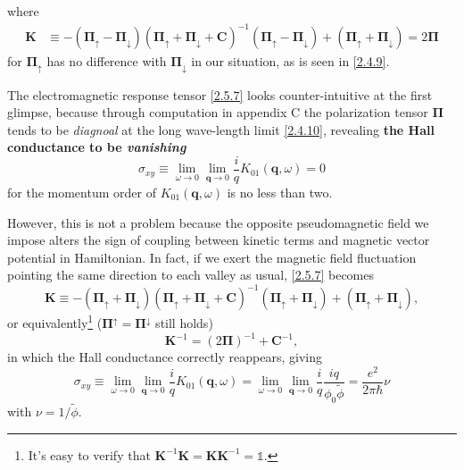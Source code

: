 \documentclass[bachelor,english,numbers]{ustcthesis}
\begin{document}
		where
		\begin{align}\label{2.5.7}
			\bm{K}&\equiv-(\bm{\Pi}_\uparrow-\bm{\Pi}_\downarrow)(\bm{\Pi}_\uparrow+\bm{\Pi}_\downarrow+\bm{C})^{-1}(\bm{\Pi}_\uparrow-\bm{\Pi}_\downarrow)+(\bm{\Pi}_\uparrow+\bm{\Pi}_\downarrow)=2\bm{\Pi}
		\end{align}
		for $\bm{\Pi}_\uparrow$ has no difference with $\bm{\Pi}_\downarrow$ in our situation, as is seen in \eqref{2.4.9}.\par
		The electromagnetic response tensor \eqref{2.5.7} looks counter-intuitive at the first glimpse, because through computation in appendix C the polarization tensor $\bm{\Pi}$ tends to be \emph{diagnoal} at the long wave-length limit \eqref{2.4.10}, revealing {\bf the Hall conductance to be \emph{vanishing}}
		\begin{equation}\label{2.5.8}
			\sigma_{xy}\equiv\lim_{\omega\rightarrow0}\lim_{\bm{q}\rightarrow0}\dfrac{i}{q}K_{01}(\bm{q},\omega)=0
		\end{equation}
		for the momentum order of $K_{01}(\bm{q},\omega)$ is no less than two.\par
		However, this is not a problem because the opposite pseudomagnetic field we impose alters the sign of coupling between kinetic terms and magnetic vector potential in Hamiltonian. In fact, if we exert the magnetic field fluctuation pointing the same direction to each valley as usual, \eqref{2.5.7} becomes 
		\begin{equation*}
			\bm{K}\equiv-(\bm{\Pi}_\uparrow+\bm{\Pi}_\downarrow)(\bm{\Pi}_\uparrow+\bm{\Pi}_\downarrow+\bm{C})^{-1}(\bm{\Pi}_\uparrow+\bm{\Pi}_\downarrow)+(\bm{\Pi}_\uparrow+\bm{\Pi}_\downarrow),
		\end{equation*}
		or equivalently\footnote{It's easy to verify that $\bm{K}^{-1}\bm{K}=\bm{K}\bm{K}^{-1}=\mathds{1}$.} ($\bm{\Pi}^\uparrow=\bm{\Pi}^\downarrow$ still holds)
		\begin{equation}\label{2.5.9}
			\bm{K}^{-1}=(2\bm{\Pi})^{-1}+\bm{C}^{-1},
		\end{equation}
		in which the Hall conductance correctly reappears, giving
		\begin{equation}\label{2.5.10}
			\sigma_{xy}\equiv\lim_{\omega\rightarrow0}\lim_{\bm{q}\rightarrow0}\dfrac{i}{q}K_{01}(\bm{q},\omega)=\lim_{\omega\rightarrow0}\lim_{\bm{q}\rightarrow0}\dfrac{i}{q}\dfrac{iq}{\phi_0 \widetilde{\phi} }=\dfrac{e^2}{2\pi\hbar}\nu
		\end{equation}
		with $\nu=1/\widetilde{\phi} $.\par
		
\end{document}
